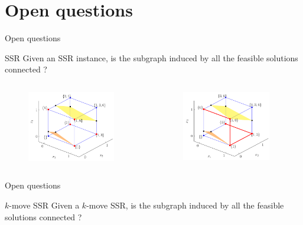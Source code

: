 \section{Open questions}

\begin{frame}{Open questions}
    \begin{block}{SSR} Given an SSR instance, is the subgraph induced by all the feasible solutions connected ? 
    \end{block}
    \begin{columns}
        \begin{column}{0.5\textwidth}
            \begin{figure}
                \centering
                \includegraphics[width=0.9\textwidth]{img/subset_conn_4.png}
                \label{fig:ps}
            \end{figure}
        \end{column}
        \begin{column}{0.5\textwidth}
            \begin{figure}
                \centering
                \includegraphics[width=0.9\textwidth]{img/subset_conn_5.png}
                \label{fig:circle}
            \end{figure}
        \end{column}
    \end{columns}
\end{frame}


\begin{frame}{Open questions}
    \begin{block}{$k$-move SSR} Given a $k$-move SSR, is the subgraph induced by all the feasible solutions connected ? 
    \end{block}
\end{frame}